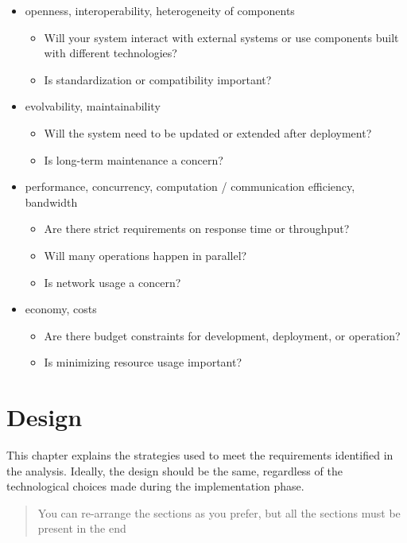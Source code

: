 \documentclass{scrartcl}
\newenvironment{guideline}[1][gray]{\color{#1}}{}
\begin{document}
\begin{guideline}
\begin{itemize}
    \item openness, interoperability, heterogeneity of components
    \begin{itemize}
      \item Will your system interact with external systems or use components built with different technologies?
      \item Is standardization or compatibility important?
    \end{itemize}

    \item evolvability, maintainability
    \begin{itemize}
      \item Will the system need to be updated or extended after deployment?
      \item Is long-term maintenance a concern?
    \end{itemize}

    \item performance, concurrency, computation / communication efficiency, bandwidth
    \begin{itemize}
      \item Are there strict requirements on response time or throughput?
      \item Will many operations happen in parallel?
      \item Is network usage a concern?
    \end{itemize}

    \item economy, costs  
    \begin{itemize}
      \item Are there budget constraints for development, deployment, or operation?
      \item Is minimizing resource usage important?
    \end{itemize}
  \end{itemize}
\end{guideline}

\section{Design}\label{design}

This chapter explains the strategies used to meet the requirements identified in the analysis. 
%
Ideally, the design should be the same, regardless of the technological choices made during the implementation phase.

\begin{quote}
You can re-arrange the sections as you prefer, but all the sections must be present in the end
\end{quote}
\end{document}
